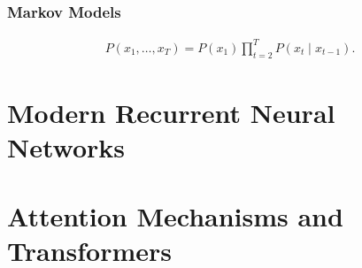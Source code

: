 \documentclass[a4paper,12pt]{article}
\theoremstyle{definition}
\begin{document}
\subsubsection*{Markov Models}
\begin{equation*}
    \begin{aligned}
        P(x_1, \ldots, x_T) = P(x_1) \prod_{t=2}^T P(x_t \mid x_{t-1}).
    \end{aligned}
\end{equation*}
\section{Modern Recurrent Neural Networks}

\section{Attention Mechanisms and Transformers}
\end{document}
